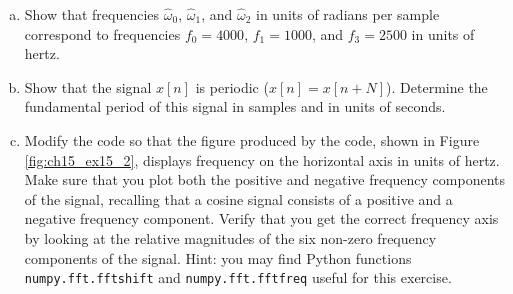 \begin{enumerate}


\begin{enumerate}[a)]
    \item Show that frequencies $\hat{\omega}_0$, $\hat{\omega}_1$, and $\hat{\omega}_2$ in units of radians per sample correspond to frequencies $f_0=4000$, $f_1=1000$, and $f_3=2500$ in units of hertz.
    \item Show that the signal $x[n]$ is periodic ($x[n]=x[n+N]$). Determine the fundamental period of this signal in samples and in units of seconds. 
    \item Modify the code so that the figure produced by the code, shown in Figure \ref{fig:ch15_ex15_2}, displays frequency on the horizontal axis in units of hertz. 
    Make sure that you plot both the positive and negative frequency components of the signal, recalling that a cosine signal consists of a positive and a negative frequency component. 
    Verify that you get the correct frequency axis by looking at the relative magnitudes of the six non-zero frequency components of the signal. 
    Hint: you may find Python functions \verb|numpy.fft.fftshift| and \verb|numpy.fft.fftfreq| useful for this exercise.
\end{enumerate}


\end{enumerate}
